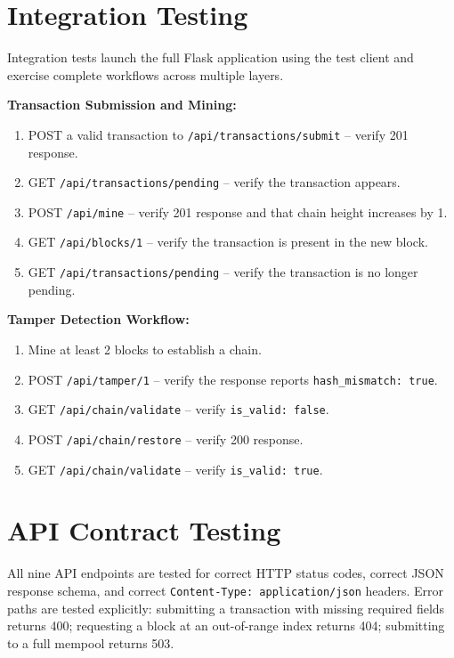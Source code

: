 \documentclass[12pt,a4paper]{report}
\begin{document}
\section{Integration Testing}

Integration tests launch the full Flask application using the test client and exercise
complete workflows across multiple layers.

\textbf{Transaction Submission and Mining:}
\begin{enumerate}[label=\arabic*.]
  \item POST a valid transaction to \texttt{/api/transactions/submit} -- verify 201 response.
  \item GET \texttt{/api/transactions/pending} -- verify the transaction appears.
  \item POST \texttt{/api/mine} -- verify 201 response and that chain height increases by 1.
  \item GET \texttt{/api/blocks/1} -- verify the transaction is present in the new block.
  \item GET \texttt{/api/transactions/pending} -- verify the transaction is no longer pending.
\end{enumerate}

\textbf{Tamper Detection Workflow:}
\begin{enumerate}[label=\arabic*.]
  \item Mine at least 2 blocks to establish a chain.
  \item POST \texttt{/api/tamper/1} -- verify the response reports \texttt{hash\_mismatch: true}.
  \item GET \texttt{/api/chain/validate} -- verify \texttt{is\_valid: false}.
  \item POST \texttt{/api/chain/restore} -- verify 200 response.
  \item GET \texttt{/api/chain/validate} -- verify \texttt{is\_valid: true}.
\end{enumerate}

\section{API Contract Testing}

All nine API endpoints are tested for correct HTTP status codes, correct JSON response
schema, and correct \texttt{Content-Type: application/json} headers. Error paths are
tested explicitly: submitting a transaction with missing required fields returns 400;
requesting a block at an out-of-range index returns 404; submitting to a full mempool
returns 503.
\end{document}
